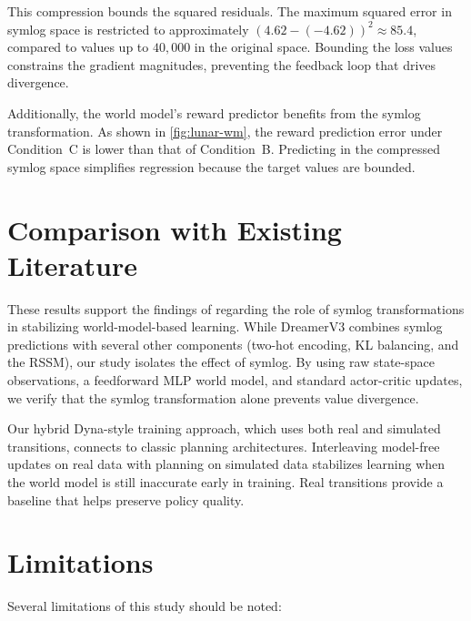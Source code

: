 This compression bounds the squared residuals. The maximum squared error in symlog space is restricted to approximately $(4.62 - (-4.62))^2 \approx 85.4$, compared to values up to $40{,}000$ in the original space. Bounding the loss values constrains the gradient magnitudes, preventing the feedback loop that drives divergence.

Additionally, the world model's reward predictor benefits from the symlog transformation. As shown in \cref{fig:lunar-wm}, the reward prediction error under Condition~C is lower than that of Condition~B. Predicting in the compressed symlog space simplifies regression because the target values are bounded.

\section{Comparison with Existing Literature}

These results support the findings of \citet{hafner2023dreamerv3} regarding the role of symlog transformations in stabilizing world-model-based learning. While DreamerV3 combines symlog predictions with several other components (two-hot encoding, KL balancing, and the RSSM), our study isolates the effect of symlog. By using raw state-space observations, a feedforward MLP world model, and standard actor-critic updates, we verify that the symlog transformation alone prevents value divergence.

Our hybrid Dyna-style training approach, which uses both real and simulated transitions, connects to classic planning architectures. Interleaving model-free updates on real data with planning on simulated data stabilizes learning when the world model is still inaccurate early in training. Real transitions provide a baseline that helps preserve policy quality.

\section{Limitations}

Several limitations of this study should be noted:

